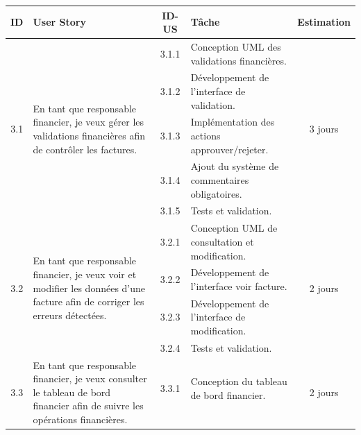\begin{table}[H]
	\centering
	\footnotesize
	
	\begin{tabularx}{\textwidth}{|c|p{3.6cm}|c|X|c|}
		\hline
		
		\rowcolor{blue!20}
		\textbf{ID} &
		\textbf{User Story} &
		\textbf{ID-US} &
		\textbf{Tâche} &
		\textbf{Estimation}
		\\ \hline
		
		\multirow{5}{*}{3.1}
		& \multirow{5}{3.6cm}{
			En tant que responsable financier, je veux gérer les validations financières afin de contrôler les factures.
		}
		& 3.1.1 & Conception UML des validations financières. & \multirow{5}{*}{3 jours}
		\\ \cline{3-4}
		
		& & 3.1.2 & Développement de l’interface de validation.
		& \\ \cline{3-4}
		
		& & 3.1.3 & Implémentation des actions approuver/rejeter.
		& \\ \cline{3-4}
		
		& & 3.1.4 & Ajout du système de commentaires obligatoires.
		& \\ \cline{3-4}
		
		& & 3.1.5 & Tests et validation.
		& \\ \hline
		
		\multirow{4}{*}{3.2}
		& \multirow{4}{3.6cm}{
			En tant que responsable financier, je veux voir et modifier les données d’une facture afin de corriger les erreurs détectées.
		}
		& 3.2.1 & Conception UML de consultation et modification. & \multirow{4}{*}{2 jours}
		\\ \cline{3-4}
		
		& & 3.2.2 & Développement de l’interface voir facture.
		& \\ \cline{3-4}
		
		& & 3.2.3 & Développement de l’interface de modification.
		& \\ \cline{3-4}
		
		& & 3.2.4 & Tests et validation.
		& \\ \hline
		
		\multirow{4}{*}{3.3}
		& \multirow{4}{3.6cm}{
			En tant que responsable financier, je veux consulter le tableau de bord financier afin de suivre les opérations financières.
		}
		& 3.3.1 & Conception du tableau de bord financier. & \multirow{4}{*}{2 jours}
		\\ \cline{3-4}
		

\end{tabularx}
\end{table}
